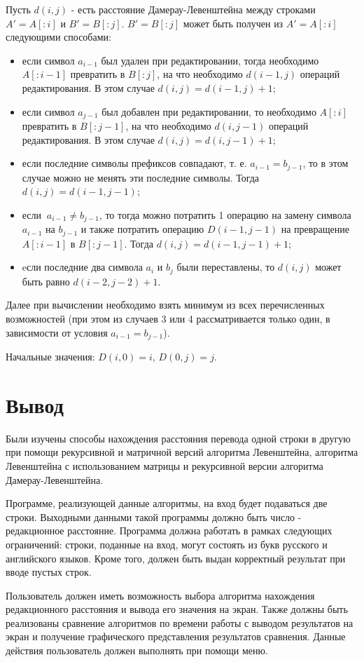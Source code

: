 Пусть $d(i,j)$ - есть расстояние Дамерау-Левенштейна между строками $A'= A[:i]$ и $B' = B[:j]$. $B' = B[:j]$ может быть получен из $A'= A[:i]$ следующими способами:

\begin{itemize}
	\item если символ $a_{i-1}$ был удален при редактировании, тогда необходимо $A[:i-1]$ превратить в $B[:j]$, на что необходимо $d(i-1,j)$ операций редактирования. В этом случае $d(i,j) = d(i-1,j) + 1$;
	\item если символ $a_{j-1}$ был добавлен при редактировании, то необходимо $A[:i]$ превратить в $B[:j-1]$, на что необходимо $d(i,j-1)$ операций редактирования. В этом случае $d(i,j) = d(i,j-1) + 1$;
	\item если последние символы префиксов совпадают, т. е. $a_{i-1} = b_{j-1}$, то в этом случае можно не менять эти последние символы. Тогда $d(i,j) = d(i-1,j-1)$;
	\item если $\medspace a_{i-1} \neq b_{j-1}$, то тогда можно потратить 1 операцию на замену символа $a_{i-1}$ на $b_{j-1}$ и также потратить  операцию $D(i-1,j-1)$ на превращение $A[:i-1]$ в $B[:j-1]$. Тогда $d(i,j) = d(i-1,j-1) + 1$;
	\item eсли последние два символа $a_{i}$ и $b_{j}$ были переставлены, то $d(i,j)$ может быть равно $d(i-2,j-2) + 1$.
\end{itemize}

Далее при вычислении  необходимо взять минимум из всех перечисленных возможностей (при этом из случаев 3 или 4 рассматривается только один, в зависимости от условия $a_{i-1} = b_{j-1}$).

Начальные значения: $D(i,0) = i$, $D(0,j) = j$.

\section{Вывод}

Были изучены способы нахождения расстояния перевода одной строки в другую при помощи рекурсивной и матричной версий алгоритма Левенштейна, алгоритма Левенштейна с использованием матрицы и рекурсивной версии алгоритма Дамерау-Левенштейна.

Программе, реализующей данные алгоритмы, на вход будет подаваться две строки. Выходными данными такой программы должно быть число - редакционное расстояние. Программа должна работать в рамках следующих ограничений: строки, поданные на вход, могут состоять из букв русского и английского языков. Кроме того, должен быть выдан корректный результат при вводе пустых строк.

Пользователь должен иметь возможность выбора алгоритма нахождения редакционного расстояния и вывода его значения на экран. Также должны быть реализованы сравнение алгоритмов по времени работы с выводом результатов на экран и получение графического представления результатов сравнения. Данные действия пользователь должен выполнять при помощи меню.